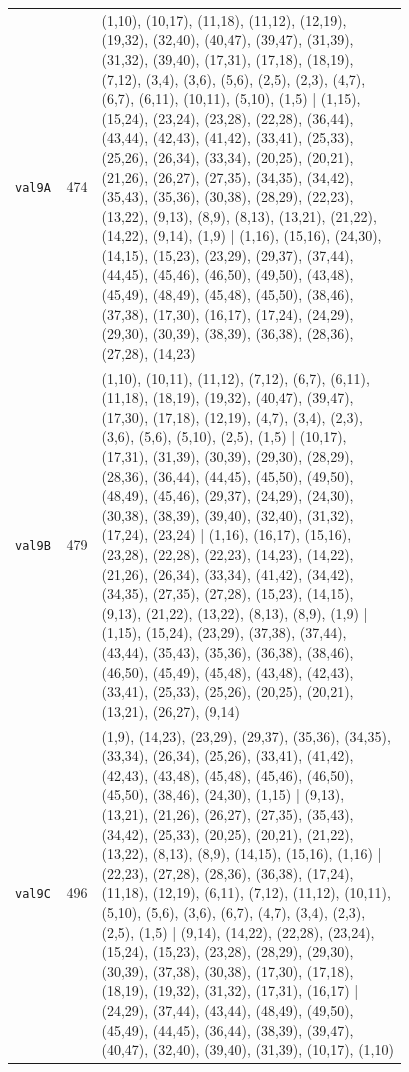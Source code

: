 \begin{landscape}
\begin{longtable}{lr>{\tiny\raggedright\arraybackslash}p{0.78\linewidth}}
\texttt{val9A} & 474 & (1,10), (10,17), (11,18), (11,12), (12,19), (19,32), (32,40), (40,47), (39,47), (31,39), (31,32), (39,40), (17,31), (17,18), (18,19), (7,12), (3,4), (3,6), (5,6), (2,5), (2,3), (4,7), (6,7), (6,11), (10,11), (5,10), (1,5) | (1,15), (15,24), (23,24), (23,28), (22,28), (36,44), (43,44), (42,43), (41,42), (33,41), (25,33), (25,26), (26,34), (33,34), (20,25), (20,21), (21,26), (26,27), (27,35), (34,35), (34,42), (35,43), (35,36), (30,38), (28,29), (22,23), (13,22), (9,13), (8,9), (8,13), (13,21), (21,22), (14,22), (9,14), (1,9) | (1,16), (15,16), (24,30), (14,15), (15,23), (23,29), (29,37), (37,44), (44,45), (45,46), (46,50), (49,50), (43,48), (45,49), (48,49), (45,48), (45,50), (38,46), (37,38), (17,30), (16,17), (17,24), (24,29), (29,30), (30,39), (38,39), (36,38), (28,36), (27,28), (14,23) \\[2pt]
\texttt{val9B} & 479 & (1,10), (10,11), (11,12), (7,12), (6,7), (6,11), (11,18), (18,19), (19,32), (40,47), (39,47), (17,30), (17,18), (12,19), (4,7), (3,4), (2,3), (3,6), (5,6), (5,10), (2,5), (1,5) | (10,17), (17,31), (31,39), (30,39), (29,30), (28,29), (28,36), (36,44), (44,45), (45,50), (49,50), (48,49), (45,46), (29,37), (24,29), (24,30), (30,38), (38,39), (39,40), (32,40), (31,32), (17,24), (23,24) | (1,16), (16,17), (15,16), (23,28), (22,28), (22,23), (14,23), (14,22), (21,26), (26,34), (33,34), (41,42), (34,42), (34,35), (27,35), (27,28), (15,23), (14,15), (9,13), (21,22), (13,22), (8,13), (8,9), (1,9) | (1,15), (15,24), (23,29), (37,38), (37,44), (43,44), (35,43), (35,36), (36,38), (38,46), (46,50), (45,49), (45,48), (43,48), (42,43), (33,41), (25,33), (25,26), (20,25), (20,21), (13,21), (26,27), (9,14) \\[2pt]
\texttt{val9C} & 496 & (1,9), (14,23), (23,29), (29,37), (35,36), (34,35), (33,34), (26,34), (25,26), (33,41), (41,42), (42,43), (43,48), (45,48), (45,46), (46,50), (45,50), (38,46), (24,30), (1,15) | (9,13), (13,21), (21,26), (26,27), (27,35), (35,43), (34,42), (25,33), (20,25), (20,21), (21,22), (13,22), (8,13), (8,9), (14,15), (15,16), (1,16) | (22,23), (27,28), (28,36), (36,38), (17,24), (11,18), (12,19), (6,11), (7,12), (11,12), (10,11), (5,10), (5,6), (3,6), (6,7), (4,7), (3,4), (2,3), (2,5), (1,5) | (9,14), (14,22), (22,28), (23,24), (15,24), (15,23), (23,28), (28,29), (29,30), (30,39), (37,38), (30,38), (17,30), (17,18), (18,19), (19,32), (31,32), (17,31), (16,17) | (24,29), (37,44), (43,44), (48,49), (49,50), (45,49), (44,45), (36,44), (38,39), (39,47), (40,47), (32,40), (39,40), (31,39), (10,17), (1,10) \\[2pt]

\end{longtable}
\end{landscape}

